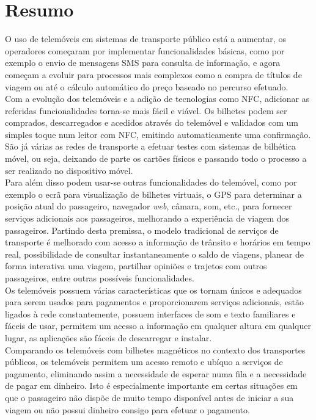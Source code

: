 \section{Resumo}

O uso de telemóveis em sistemas de transporte público está a aumentar, os operadores começaram por implementar funcionalidades básicas, como por exemplo o envio de mensagens SMS para consulta de informação, e agora começam a evoluir para processos mais complexos como a compra de títulos de viagem ou até o cálculo automático do preço baseado no percurso efetuado.
\\Com a evolução dos telemóveis e a adição de tecnologias como NFC, adicionar as referidas funcionalidades torna-se mais fácil e viável. Os bilhetes podem ser comprados, descarregados e acedidos através do telemóvel e validados com um simples toque num leitor com NFC, emitindo automaticamente uma confirmação. São já várias as redes de transporte a efetuar testes com sistemas de bilhética móvel, ou seja, deixando de parte os cartões físicos e passando todo o processo a ser realizado no dispositivo móvel.
\\Para além disso podem usar-se outras funcionalidades do telemóvel, como por exemplo o ecrã para visualização de bilhetes virtuais, o GPS para determinar a posição atual do passageiro, navegador \textit{web}, câmara, som, etc., para fornecer serviços adicionais aos passageiros, melhorando a experiência de viagem dos passageiros. Partindo desta premissa, o modelo tradicional de serviços de transporte é melhorado com acesso a informação de trânsito e horários em tempo real, possibilidade de consultar instantaneamente o saldo de viagens, planear de forma interativa uma viagem, partilhar opiniões e trajetos com outros passageiros, entre outras possíveis funcionalidades.\cite{Nunes2011}
\\Os telemóveis possuem várias características que os tornam únicos e adequados para serem usados para pagamentos e proporcionarem serviços adicionais, estão ligados à rede constantemente, possuem interfaces de som e texto familiares e fáceis de usar, permitem um acesso a informação em qualquer altura em qualquer lugar, as aplicações são fáceis de descarregar e instalar.
\\Comparando os telemóveis com bilhetes magnéticos no contexto dos transportes públicos, os telemóveis permitem um acesso remoto e ubíquo a serviços de pagamento, eliminando assim a necessidade de esperar numa fila e a necessidade de pagar em dinheiro. Isto é especialmente importante em certas situações em que o passageiro não dispõe de muito tempo disponível antes de iniciar a sua viagem ou não possui dinheiro consigo para efetuar o pagamento.\cite{Mallat2007}
